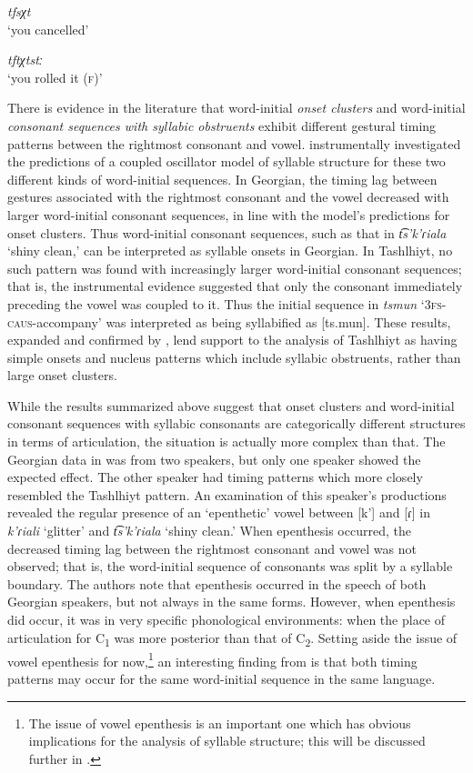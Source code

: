 \ea\label{ex:2.5}
\ea  \textit{tfsχt}\\
\glt ‘you cancelled’

\ex  \textit{tftχtstː}\\
\glt ‘you rolled it (\textsc{f})’

  \citep[95]{Ridouane2002}
\z
\z

  There is evidence in the literature that word-initial \textit{onset clusters} and word-initial \textit{consonant sequences with syllabic obstruents} exhibit different gestural timing patterns between the rightmost consonant and vowel. \citet{GoldsteinEtAl2007} instrumentally investigated the predictions of a coupled oscillator model of syllable structure for these two different kinds of word-initial sequences. In Georgian, the timing lag between gestures associated with the rightmost consonant and the vowel decreased with larger word-initial consonant sequences, in line with the model’s predictions for onset clusters. Thus word-initial consonant sequences, such as that in \textit{t͡s’k’ɾiala} ‘shiny clean,’ can be interpreted as syllable onsets in Georgian. In Tashlhiyt, no such pattern was found with increasingly larger word-initial consonant sequences; that is, the instrumental evidence suggested that only the consonant immediately preceding the vowel was coupled to it. Thus the initial sequence in \textit{tsmun} ‘\textsc{3fs}-\textsc{caus}-accompany’ was interpreted as being syllabified as [ts.mun]. These results, expanded and confirmed by \citet{HermesEtAl2011}, lend support to the analysis of Tashlhiyt as having simple onsets and nucleus patterns which include syllabic obstruents, rather than large onset clusters.

  While the results summarized above suggest that onset clusters and word-initial consonant sequences with syllabic consonants are categorically different structures in terms of articulation, the situation is actually more complex than that. The Georgian data in \citet{GoldsteinEtAl2007} was from two speakers, but only one speaker showed the expected effect. The other speaker had timing patterns which more closely resembled the Tashlhiyt pattern. An examination of this speaker’s productions revealed the regular presence of an ‘epenthetic’ vowel between [k’] and [ɾ] in \textit{k'ɾiali} ‘glitter’ and \textit{t͡s’k’ɾiala} ‘shiny clean.’ When epenthesis occurred, the decreased timing lag between the rightmost consonant and vowel was not observed; that is, the word-initial sequence of consonants was split by a syllable boundary. The authors note that epenthesis occurred in the speech of both Georgian speakers, but not always in the same forms. However, when epenthesis did occur, it was in very specific phonological environments: when the place of articulation for C\textsubscript{1} was more posterior than that of C\textsubscript{2}. Setting aside the issue of vowel epenthesis for now,\footnote{{The issue of vowel epenthesis is an important one which has obvious implications for the analysis of syllable structure; this will be discussed further in .}} an interesting finding from \citet{GoldsteinEtAl2007} is that both timing patterns may occur for the same word-initial sequence in the same language.

